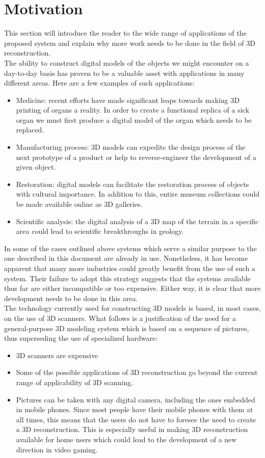 \documentclass[12pt,a4paper,twoside,openright]{report}
\begin{document}
\section{Motivation}
This section will introduce the reader to the wide range of applications of the proposed system and explain why more work needs to be done in the field of 3D reconstruction.\\
\linebreak 
The ability to construct digital models of the objects we might encounter on a day-to-day basis has proven to be a valuable asset with applications in many different areas. Here are a few examples of such applications:
\begin{itemize}
\item Medicine: recent efforts have made significant leaps towards making 3D printing of organs a reality. In order to create a functional replica of a sick organ we must first produce a digital model of the organ which needs to be replaced. 
\item Manufacturing process: 3D models can expedite the design process of the next prototype of a product or help to reverse-engineer the development of a given object.   
\item Restoration: digital models can facilitate the restoration process of objects with cultural importance. In addition to this, entire museum collections could be made available online as 3D galleries.  
\item Scientific analysis: the digital analysis of a 3D map of the terrain in a specific area could lead to scientific breakthroughs in geology.
\end{itemize}
In some of the cases outlined above systems which serve a similar purpose to the one described in this document are already in use. Nonetheless, it has become apparent that many more industries could greatly benefit from the use of such a system. Their failure to adopt this strategy suggests that the systems available thus far are either incompatible or too expensive. Either way, it is clear that more development needs to be done in this area. \\  
\linebreak
The technology currently used for constructing 3D models is based, in most cases, on the use of 3D scanners. What follows is a justification of the need for a general-purpose 3D modeling system which is based on a sequence of pictures, thus superseding the use of specialized hardware:
\begin{itemize}
\item 3D scanners are expensive
\item Some of the possible applications of 3D reconstruction go beyond the current range of applicability of 3D scanning. 
\item Pictures can be taken with any digital camera, including the ones embedded in mobile phones. Since most people have their mobile phones with them at all times, this means that the users do not have to foresee the need to create a 3D reconstruction. This is especially useful in making 3D reconstruction available for home users which could lead to the development of a new direction in video gaming.
\end{itemize}
\end{document}
